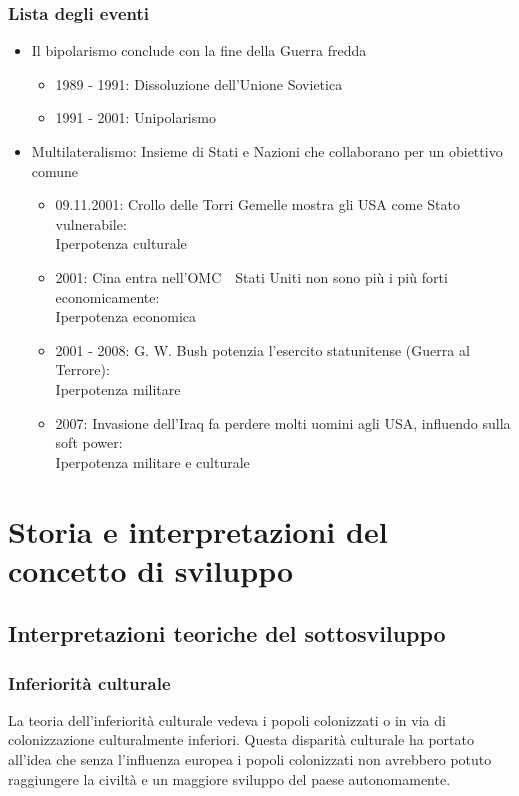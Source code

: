 \documentclass{article}
\newcommand*\circled[1]{
    \tikz[baseline=(char.base)]{            
        \node[shape=circle,draw,inner sep=1.1pt] (char) {#1};
    }
}
\begin{document}
\subsubsection{Lista degli eventi}
\begin{itemize}
    \item Il bipolarismo conclude con la fine della Guerra fredda
        \begin{itemize}[label=\textrightarrow]
            \item 1989 - 1991: Dissoluzione dell'Unione Sovietica
            \item 1991 - 2001: Unipolarismo
        \end{itemize}
    \item Multilateralismo: Insieme di Stati e Nazioni che collaborano per un obiettivo comune
        \begin{itemize}[label=\textrightarrow]
            \item 09.11.2001: Crollo delle Torri Gemelle mostra gli USA come Stato vulnerabile:\\
                Iperpotenza culturale {\color{red}{\circled{--}}}
            \item 2001: Cina entra nell'OMC\ \textrightarrow\ Stati Uniti non sono più i più forti
                economicamente:\\ Iperpotenza economica {\color{red}{\circled{--}}}
            \item 2001 - 2008: G. W. Bush potenzia l'esercito statunitense (Guerra al Terrore):\\
                Iperpotenza militare {\color{green}{\circled{+}}}
            \item 2007: Invasione dell'Iraq fa perdere molti uomini agli USA, influendo sulla soft power:\\
                Iperpotenza militare e culturale {\color{red}{\circled{--}\circled{--}}}
        \end{itemize}
\end{itemize}
\pagebreak

\section{Storia e interpretazioni del concetto di sviluppo}
\subsection{Interpretazioni teoriche del sottosviluppo}
\subsubsection{Inferiorità culturale}
La teoria dell'inferiorità culturale vedeva i popoli colonizzati o in via di colonizzazione
culturalmente inferiori. Questa disparità culturale ha portato all'idea che senza l'influenza
europea i popoli colonizzati non avrebbero potuto raggiungere la civiltà e un maggiore sviluppo
del paese autonomamente.
\end{document}
